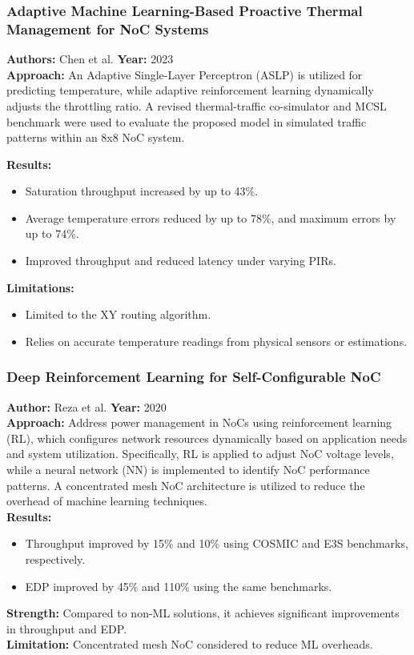 \documentclass{beamer}
\begin{document}
\begin{frame}
\frametitle{Adaptive Machine Learning-Based Proactive Thermal Management for NoC Systems}

\textbf{Authors:} Chen et al.
\textbf{Year:} 2023 \\[10pt]

\textbf{Approach:}
An Adaptive Single-Layer Perceptron (ASLP) is utilized for predicting temperature, while adaptive reinforcement learning dynamically adjusts the throttling ratio. A revised thermal-traffic co-simulator and MCSL benchmark were used to evaluate the proposed model in simulated traffic patterns within an 8x8 NoC system.  

\textbf{Results:}
\begin{itemize}
\item Saturation throughput increased by up to 43\%.
\item Average temperature errors reduced by up to 78\%, and maximum errors by up to 74\%.
\item Improved throughput and reduced latency under varying PIRs.
\end{itemize}

\textbf{Limitations:}
\begin{itemize}
\item Limited to the XY routing algorithm.
\item Relies on accurate temperature readings from physical sensors or estimations.
\end{itemize}
\end{frame}


\begin{frame}
\frametitle{Deep Reinforcement Learning for Self-Configurable NoC}

\textbf{Author:} Reza et al.
\textbf{Year:} 2020 \\[5pt]

\textbf{Approach:} Address power management in NoCs using reinforcement learning (RL), which configures network resources dynamically based on application needs and system utilization. Specifically, RL is applied to adjust NoC voltage levels, while a neural network (NN) is implemented to identify NoC performance patterns. A concentrated mesh NoC architecture is utilized to reduce the overhead of machine learning techniques. \\[5pt]

\textbf{Results:}
\begin{itemize}
\item Throughput improved by 15\% and 10\% using COSMIC and E3S benchmarks, respectively.
\item EDP improved by 45\% and 110\% using the same benchmarks.
\end{itemize}

\textbf{Strength:} Compared to non-ML solutions, it achieves significant improvements in throughput and EDP. \\[5pt]

\textbf{Limitation:} Concentrated mesh NoC considered to reduce ML overheads. \\[5pt]

\end{frame}
\end{document}
